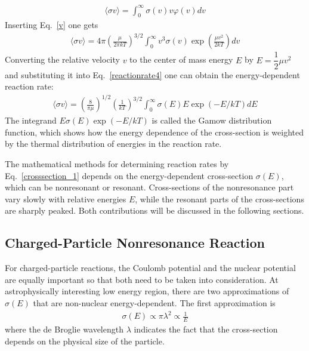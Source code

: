  \begin{equation}
    \label{reactionrate3}
    \begin{aligned}
        \langle \sigma v \rangle =\int_{0}^{\infty} \sigma(v)v\varphi(v)dv
    \end{aligned}
\end{equation}
Inserting Eq.~\ref{v} one gets
\begin{equation}
    \label{reactionrate4}
    \begin{aligned}
        \langle \sigma v \rangle = 4\pi (\frac{\mu}{2\pi kT})^{3/2} \int_{0}^{\infty}v^3 \sigma(v) \exp(\frac{\mu v^2}{2kT})dv
    \end{aligned}
\end{equation}
Converting the relative velocity $v$ to the center of mass energy $E$ by $E=\dfrac{1}{2}\mu v^2$ and substituting it into Eq.~\ref{reactionrate4} one can obtain the energy-dependent reaction rate:
\begin{equation}
    \label{crosssection_1}
    \begin{aligned}
        \langle \sigma v \rangle = (\frac{8}{\pi \mu})^{1/2}(\frac{1}{kT})^{3/2} \int_{0}^{\infty} \sigma(E) E \exp(-E/kT)dE
    \end{aligned}
\end{equation}
The integrand $E\sigma(E)\exp(-E/kT)$ is called the Gamow distribution function, which shows how the energy dependence of the cross-section is weighted by the thermal distribution of energies in the reaction rate.


The mathematical methods for determining reaction rates by Eq.~\ref{crosssection_1} depends on the energy-dependent cross-section $\sigma(E)$, which can be nonresonant or resonant. Cross-sections of the nonresonance part vary slowly with relative energies $E$, while the resonant parts of the cross-sections are sharply peaked. Both contributions will be discussed in the following sections.


\subsection{Charged-Particle Nonresonance Reaction}

For charged-particle reactions, the Coulomb potential and the nuclear potential are equally important so that both need to be taken into consideration.
At astrophysically interesting low energy region, there are two approximations of  $\sigma(E)$ that are non-nuclear energy-dependent.  The first approximation is
\begin{equation}
    \begin{aligned}
        \sigma(E) \propto \pi \lambda^2  \propto \frac{1}{E}
    \end{aligned}
\end{equation}
where the de Broglie wavelength $\lambda$ indicates the fact that  the  cross-section depends on the physical size of the particle.

